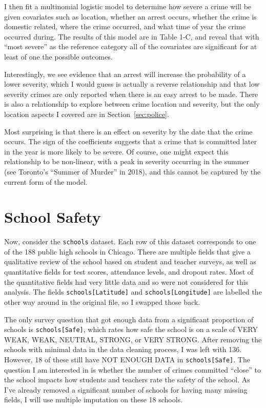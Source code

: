 \documentclass[11pt]{article}
\newcommand{\1}{\mathds{1}}
\def\code#1{\texttt{#1}}
\begin{document}
I then fit a multinomial logistic model to determine how severe a crime will be given covariates such as location, whether an arrest occurs, whether the crime is domestic related, where the crime occurred, and what time of year the crime occurred during. The results of this model are in Table 1-C, and reveal that with ``most severe'' as the reference category all of the covariates are significant for at least of one the possible outcomes.

Interestingly, we see evidence that an arrest will increase the probability of a lower severity, which I would guess is actually a reverse relationship and that low severity crimes are only reported when there is an easy arrest to be made. There is also a relationship to explore between crime location and severity, but the only location aspects I covered are in Section~\ref{sec:police}.

Most surprising is that there is an effect on severity by the date that the crime occurs. The sign of the coefficients suggests that a crime that is committed later in the year is more likely to be severe. Of course, one might expect this relationship to be non-linear, with a peak in severity occurring in the summer (see Toronto's ``Summer of Murder'' in 2018), and this cannot be captured by the current form of the model. 


\section{School Safety}

Now, consider the \code{schools} dataset. Each row of this dataset corresponds to one of the 188 public high schools in Chicago. There are multiple fields that give a qualitative review of the school based on student and teacher surveys, as well as quantitative fields for test scores, attendance levels, and dropout rates. Most of the quantitative fields had very little data and so were not considered for this analysis. The fields \code{schools[Latitude]} and \code{schools[Longitude]} are labelled the other way around in the original file, so I swapped those back. 

The only survey question that got enough data from a significant proportion of schools is \code{schools[Safe]}, which rates how safe the school is on a scale of VERY WEAK, WEAK, NEUTRAL, STRONG, or VERY STRONG. After removing the schools with minimal data in the data cleaning process, I was left with 136. However, 18 of these still have NOT ENOUGH DATA in \code{schools[Safe]}. The question I am interested in is whether the number of crimes committed ``close'' to the school impacts how students and teachers rate the safety of the school. As I've already removed a significant number of schools for having many missing fields, I will use multiple imputation on these 18 schools. 
\end{document}
